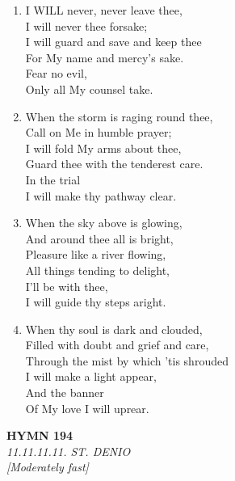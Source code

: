 \begin{enumerate}
    \item I WILL never, never leave thee, \\
        I will never thee forsake; \\
        I will guard and save and keep thee \\
        For My name and mercy's sake. \\
        Fear no evil, \\
        Only all My counsel take.

    \item When the storm is raging round thee, \\
        Call on Me in humble prayer; \\
        I will fold My arms about thee, \\
        Guard thee with the tenderest care. \\
        In the trial \\
        I will make thy pathway clear.

    \item When the sky above is glowing, \\
        And around thee all is bright, \\
        Pleasure like a river flowing, \\
        All things tending to delight, \\
        I'll be with thee, \\
        I will guide thy steps aright.

    \item When thy soul is dark and clouded, \\
        Filled with doubt and grief and care, \\
        Through the mist by which 'tis shrouded \\
        I will make a light appear, \\
        And the banner \\
        Of My love I will uprear.

\end{enumerate}

\newpage
\begin{center}
    {\Large \textbf{HYMN 194}}
    \\
    \textit{11.11.11.11. ST. DENIO}
    \\
    \textit{\small [Moderately fast]}
\end{center}
\vspace{1em}

